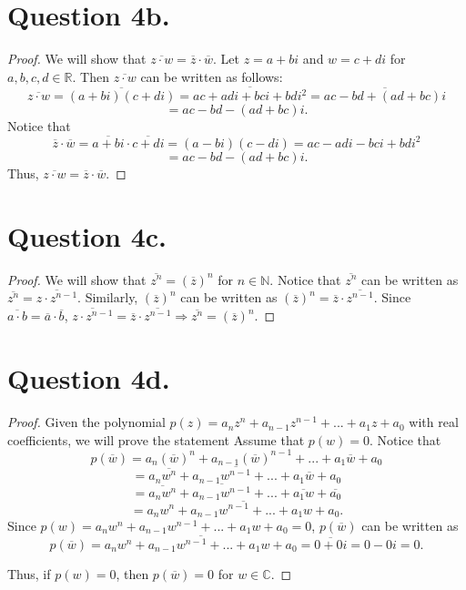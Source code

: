 \documentclass{article}
\begin{document}
\section*{Question 4b.}
\begin{proof}
    We will show that $ \overline{z \cdot w} = \overline{z} \cdot \overline{w} $. Let $ z = a + bi $ and $ w = c + di $ for $ a, b, c, d \in \mathbb{R} $. Then $ \overline{z \cdot w} $ can be written as follows: 
    \[
        \overline{z \cdot w} = \overline{(a + bi)(c + di)} = \overline{ac + adi + bci + bdi^2} = \overline{ac - bd + (ad + bc)i}
    \]
    \[
        = ac - bd - (ad + bc)i.
    \]
    Notice that
    \[
        \overline{z} \cdot \overline{w} = \overline{a + bi} \cdot \overline{c + di} = (a - bi)(c - di) = ac - adi - bci + bdi^2
    \]
    \[
        = ac - bd - (ad + bc)i.
    \]
    Thus, $ \overline{z \cdot w} = \overline{z} \cdot \overline{w} $.
\end{proof}

\section*{Question 4c.}
\begin{proof}
    We will show that $ \overline{z^n} = (\overline{z})^n $ for $ n \in \mathbb{N} $. Notice that $ \overline{z^n} $ can be written as $ \overline{z^n} = \overline{z \cdot z^{n-1}} $. Similarly, $ (\overline{z})^n $ can be written as $ (\overline{z})^n = \overline{z} \cdot \overline{z^{n - 1}} $. Since $ \overline{a \cdot b} = \overline{a} \cdot \overline{b} $, $ \overline{z \cdot z^{n - 1}} = \overline{z} \cdot \overline{z^{n - 1}} \Rightarrow \overline{z^n} = (\overline{z})^n $.
\end{proof}

\section*{Question 4d.}
\begin{proof}
    Given the polynomial $ p(z) = a_n z^n + a_{n - 1} z^{n - 1} + ... + a_1 z + a_0 $ with real coefficients, we will prove the statement  Assume that $ p(w) = 0 $. Notice that
    \[
        p(\overline{w}) = a_n (\overline{w})^n + a_{n - 1} (\overline{w})^{n - 1} + ... + a_1 \overline{w} + a_0
    \]
    \[
        = a_n \overline{w^n} + a_{n - 1} \overline{w^{n - 1}} + ... + a_1 \overline{w} + a_0
    \]
    \[
        = \overline{a_n w^n} + \overline{a_{n - 1} w^{n - 1}} + ... + \overline{a_1 w} + \overline{a_0}
    \]
    \[
        = \overline{a_n w^n + a_{n - 1} w^{n - 1} + ... + a_1 w + a_0}.
    \]
    Since $ p(w) = a_n w^n + a_{n - 1} w^{n - 1} + ... + a_1 w + a_0 = 0 $, $ p(\overline{w}) $ can be written as
    \[
        p(\overline{w}) = \overline{a_n w^n + a_{n - 1} w^{n - 1} + ... + a_1 w + a_0} = \overline{0 + 0i} = 0 - 0i = 0.
    \]

    \noindent Thus, if $ p(w) = 0 $, then $ p(\overline{w}) = 0 $ for $ w \in \mathbb{C} $.
\end{proof}
\end{document}
